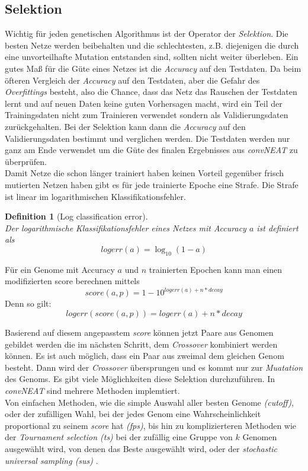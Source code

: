 \documentclass[]{scrartcl}
\newtheorem{defi}[satz]{Definition}
\begin{document}
		\subsection{Selektion}\label{select}
			
			Wichtig für jeden genetischen Algorithmus ist der Operator der \textit{Selektion}. Die besten Netze werden beibehalten und die schlechtesten,
			z.B. diejenigen die durch eine unvorteilhafte Mutation entstanden sind, sollten nicht weiter überleben.
			Ein gutes Maß für die Güte eines Netzes ist die \textit{Accuracy} auf den Testdaten. Da beim öfteren Vergleich der \textit{Accuracy} auf den Testdaten,
			aber die Gefahr des \textit{Overfittings} besteht, also die Chance, dass das Netz das Rauschen der Testdaten lernt und auf neuen Daten keine guten Vorhersagen macht,
			wird ein Teil der Trainingsdaten nicht zum Trainieren verwendet sondern als Validierungsdaten zurückgehalten.
			Bei der Selektion kann dann die \textit{Accuracy} auf den Validierungsdaten bestimmt und verglichen werden.
			Die Testdaten werden nur ganz am Ende verwendet um die Güte des finalen Ergebnisses aus \textit{convNEAT} zu überprüfen.\\

			Damit Netze die schon länger trainiert haben keinen Vorteil gegenüber frisch mutierten Netzen haben gibt es für jede trainierte Epoche eine Strafe.
			Die Strafe ist linear im logarithmischen Klassifikationsfehler.

			\begin{defi}[Log classification error] ~ \\
				Der logarithmische Klassifikationsfehler eines Netzes mit Accuracy $a$ ist definiert als \\
				$$ logerr(a) = \log_{10}(1 - a)$$
			\end{defi}
		
			Für ein Genome mit Accuracy $a$ und $n$ trainierten Epochen kann man einen modifizierten score berechnen mittels\\
			$$score(a, p) =  1 - 10^{logerr(a) + n * decay}$$
			Denn so gilt:
			$$ logerr(score(a, p)) = logerr(a) + n * decay$$

			Basierend auf diesem angepasstem \textit{score} können jetzt Paare aus Genomen gebildet werden die im nächsten Schritt, dem \textit{Crossover} kombiniert werden können.
			Es ist auch möglich, dass ein Paar aus zweimal dem gleichen Genom besteht. Dann wird der \textit{Crossover} übersprungen und es kommt nur zur \textit{Muatation} des Genoms.
			Es gibt viele Möglichkeiten diese Selektion durchzuführen. In \textit{convNEAT} sind mehrere Methoden implemtiert. \\
			Von einfachen Methoden, wie die simple Auswahl aller besten Genome \textit{(cutoff)}, oder der zufälligen Wahl, bei der jedes Genom eine Wahrscheinlichkeit
			proportional zu seinem \textit{score} hat \textit{(fps)}, bis hin zu komplizierteren Methoden wie der \textit{Tournament selection (ts)} bei der zufällig eine
			Gruppe von $k$ Genomen ausgewählt wird, von denen das Beste ausgewählt wird, oder der \textit{stochastic universal sampling (sus)} \cite{sus}.
\end{document}
